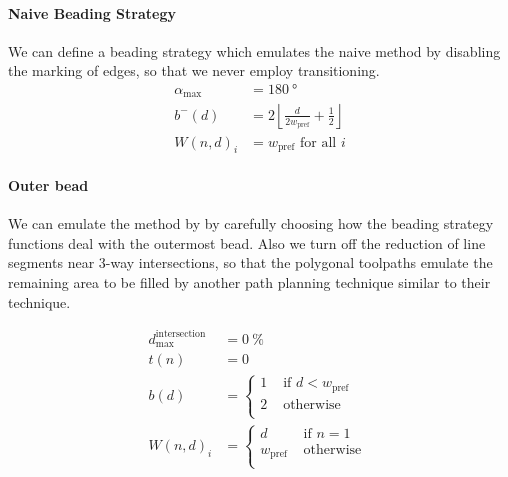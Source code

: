 \paragraph{Naive Beading Strategy}
We can define a beading strategy which emulates the naive method by disabling the marking of edges, so that we never employ transitioning.
\begin{align*}
\alpha_\text{max} &= \SI{180}{\degree} \\
b^-(d) &= 2 \left\lfloor \frac{d}{ 2w_\text{pref}} + \frac12 \right\rfloor \\
W(n,d)_i &= w_\text{pref} \text{ for all } i 
\end{align*}



\paragraph{Outer bead}
We can emulate the method by \citeauthor{Moesen2011} by carefully choosing how the beading strategy functions deal with the outermost bead.
Also we turn off the reduction of line segments near 3-way intersections, so that the polygonal toolpaths emulate the remaining area to be filled by another path planning technique similar to their technique.

\begin{align*}
d_\text{max}^\text{intersection} &= \SI{0}{\percent} \\
t(n) &= 0 \\
b(d) &=
\begin{cases}
1 & \text{ if } d < w_\text{pref} \\
2 & \text{ otherwise } \\
\end{cases}
 \\
W(n,d)_i &= 
\begin{cases}
d & \text{ if } n = 1 \\
w_\text{pref} & \text{ otherwise } \\
\end{cases}
\end{align*}


